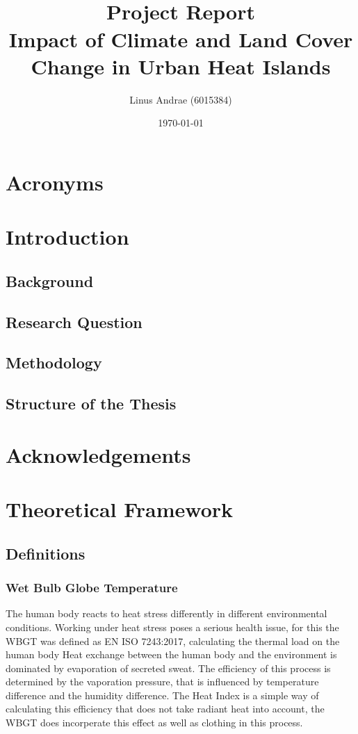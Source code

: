 \documentclass[a4paper, english]{article}
\title{\textit{} \\ \vspace{1cm}Project Report \\ \vspace{1cm} \textbf{\huge Impact of Climate and Land Cover Change in Urban Heat Islands}\\ \vspace{1.2cm} }
\author{Linus Andrae (6015384)}
\date{\today}
\begin{document}
  
  \newpage

  
  \newpage

  \tableofcontents
  \listoffigures
  \listoftables

  \section*{Acronyms}
  \printglossaries%
\newpage

\section{Introduction}
    \subsection{Background}
   
    \subsection{Research Question}
    
    \subsection{Methodology}
    \subsection{Structure of the Thesis}

\section*{Acknowledgements}

\section{Theoretical Framework}
    \subsection{Definitions}
    
    \subsubsection{Wet Bulb Globe Temperature}
    The human body reacts to heat stress differently in different environmental conditions. 
    Working under heat stress poses a serious health issue, for this the \gls{WBGT} was defined as EN ISO 7243:2017, calculating the thermal load on the human body\cite{isoWBGT}
    Heat exchange between the human body and the environment is dominated by evaporation of secreted sweat.
    The efficiency of this process is determined by the vaporation pressure, that is influenced by temperature difference and the humidity difference. %
    The Heat Index is a simple way of calculating this efficiency that does not take radiant heat into account, the WBGT does incorperate this effect as well as clothing in this process. 
\end{document}
